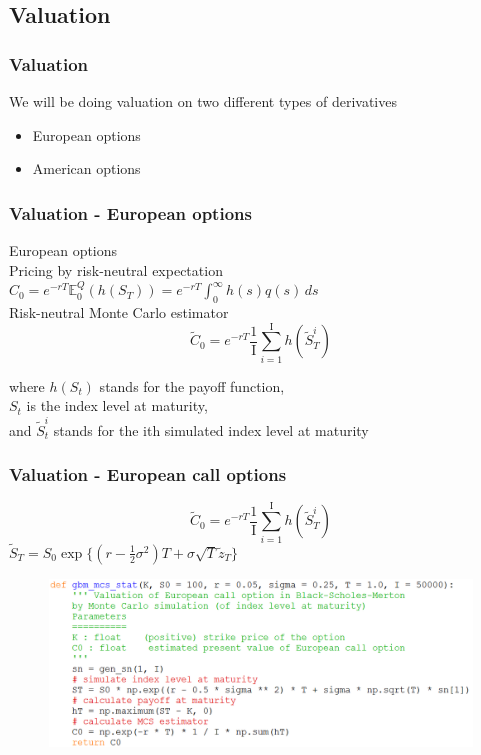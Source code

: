 \documentclass{beamer}
\begin{document}
\subsection{Valuation}
\begin{frame}
\frametitle{Valuation}
We will be doing valuation on two different types of derivatives\\ [4mm]
\begin{itemize}
	\item European options\\[9mm]
	\item American options
\end{itemize}
\end{frame}

\begin{frame}
\frametitle{Valuation - European options}
\begin{center}
European options\\ [8mm]
Pricing by risk-neutral expectation\\ [3mm]
$C_{0} = e^{-rT} \mathbb{E}_{0}^{Q}(h(S_{T})) = e^{-rT} \int_{0}^{\infty} h(s)q(s) \,ds $\\ [6mm]
Risk-neutral Monte Carlo estimator
$$\tilde{C}_{0} = e^{-rT} \frac{1}{\mathrm{I}} \sum_{i=1}^{\mathrm{I}} h({\tilde{S}}_{T}^{i}) $$
\end{center}
\begin{flushright}
where $h(S_{t})$ stands for the payoff function, \\
$S_{t}$ is the index level at maturity, \\
and $\tilde{S}_{t}^{i} $ stands for the ith simulated index level at maturity
\end{flushright}
\end{frame}

\begin{frame}
\frametitle{Valuation - European call options}
\begin{center}
$$\tilde{C}_{0} = e^{-rT} \frac{1}{\mathrm{I}} \sum_{i=1}^{\mathrm{I}} h({\tilde{S}}_{T}^{i}) $$
$\tilde{S}_{T} = S_{0}\exp\{(r-\frac{1}{2}\sigma^{2})T + \sigma\sqrt{T}\tilde{z}_{T}\}$\\[5mm]
\begin{figure}[H]
	\includegraphics[scale=0.4]{european_call_mcs.png}
\end{figure}
\end{center}
\end{frame}
\end{document}
